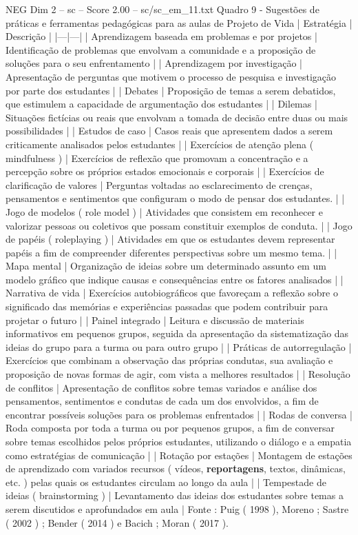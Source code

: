 \begin{textsample}{NEG Dim 2 – sc – Score 2.00 – sc/sc\_em\_11.txt}
Quadro 9 - Sugestões de práticas e ferramentas pedagógicas para as aulas de Projeto de Vida | Estratégia | Descrição | |---|---| | Aprendizagem baseada em problemas e por projetos | Identificação de problemas que envolvam a comunidade e a proposição de soluções para o seu enfrentamento | | Aprendizagem por investigação | Apresentação de perguntas que motivem o processo de pesquisa e investigação por parte dos estudantes | | Debates | Proposição de temas a serem debatidos, que estimulem a capacidade de argumentação dos estudantes | | Dilemas | Situações fictícias ou reais que envolvam a tomada de decisão entre duas ou mais possibilidades | | Estudos de caso | Casos reais que apresentem dados a serem criticamente analisados pelos estudantes | | Exercícios de atenção plena ( mindfulness ) | Exercícios de reflexão que promovam a concentração e a percepção sobre os próprios estados emocionais e corporais | | Exercícios de clarificação de valores | Perguntas voltadas ao esclarecimento de crenças, pensamentos e sentimentos que configuram o modo de pensar dos estudantes. | | Jogo de modelos ( role model ) | Atividades que consistem em reconhecer e valorizar pessoas ou coletivos que possam constituir exemplos de conduta. | | Jogo de papéis ( roleplaying ) | Atividades em que os estudantes devem representar papéis a fim de compreender diferentes perspectivas sobre um mesmo tema. | | Mapa mental | Organização de ideias sobre um determinado assunto em um modelo gráfico que indique causas e consequências entre os fatores analisados | | Narrativa de vida | Exercícios autobiográficos que favoreçam a reflexão sobre o significado das memórias e experiências passadas que podem contribuir para projetar o futuro | | Painel integrado | Leitura e discussão de materiais informativos em pequenos grupos, seguida da apresentação da sistematização das ideias do grupo para a turma ou para outro grupo | | Práticas de autorregulação | Exercícios que combinam a observação das próprias condutas, sua avaliação e proposição de novas formas de agir, com vista a melhores resultados | | Resolução de conflitos | Apresentação de conflitos sobre temas variados e análise dos pensamentos, sentimentos e condutas de cada um dos envolvidos, a fim de encontrar possíveis soluções para os problemas enfrentados | | Rodas de conversa | Roda composta por toda a turma ou por pequenos grupos, a fim de conversar sobre temas escolhidos pelos próprios estudantes, utilizando o diálogo e a empatia como estratégias de comunicação | | Rotação por estações | Montagem de estações de aprendizado com variados recursos ( vídeos, \textbf{reportagens}, textos, dinâmicas, etc. ) pelas quais os estudantes circulam ao longo da aula | | Tempestade de ideias ( brainstorming ) | Levantamento das ideias dos estudantes sobre temas a serem discutidos e aprofundados em aula | Fonte : Puig ( 1998 ), Moreno ; Sastre ( 2002 ) ; Bender ( 2014 ) e Bacich ; Moran ( 2017 ).

\end{textsample}
